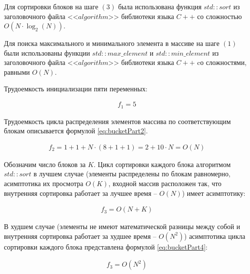 Для сортировки блоков на шаге $(3)$ была использована функция $std::sort$ \cite{std_sort} из заголовочного файла <<$algorithm$>> библиотеки языка $C++$ со сложностью $O(N \cdot \log_2(N))$.

Для поиска максимального и минимального элемента в массиве на шаге $(1)$ были использованы функции $std::max\_element$ \cite{std_max} и $std::min\_element$ \cite{std_min} из заголовочного файла <<$algorithm$>> библиотеки языка $C++$ cо сложностями, равными $O(N)$.

Трудоемкость инициализации пяти переменных:

\begin{equation}
	\label{eq:bucketPart1}
	\begin{gathered}
		f_1 = 5
	\end{gathered}
\end{equation}

Трудоемкость цикла распределения элементов массива по соответствующим блокам описывается формулой \ref{eq:bucketPart2}.

\begin{equation}
	\label{eq:bucketPart2}
	\begin{gathered}
		f_2 = 1 + 1 + N \cdot (8 + 1 + 1) = 2 + 10 \cdot N = O(N)
	\end{gathered}
\end{equation}

Обозначим число блоков за $K$.
Цикл сортировки каждого блока алгоритмом $std::sort$ в лучшем случае (элементы распределены по блокам равномерно, асимптотика их просмотра $O(K)$, входной массив расположен так, что внутренняя сортировка работает за лучшее время -- $O(N)$) имеет асимптотику:

\begin{equation}
	\label{eq:bucketPart3}
	\begin{gathered}
		f_3 = O(N + K)
	\end{gathered}
\end{equation}

В худшем случае (элементы не имеют математической разницы между собой и внутренняя сортировка работает за худшее время -- $O(N^2)$) асимптотика цикла сортировки каждого блока представлена формулой \ref{eq:bucketPart4}:

\begin{equation}
	\label{eq:bucketPart4}
	\begin{gathered}
		f_3 = O(N^2)
	\end{gathered}
\end{equation}

